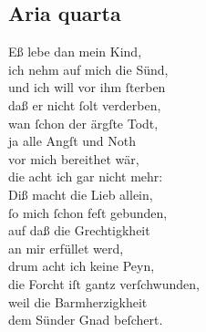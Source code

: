 \documentclass{ees}
\newenvironment{lyrics}[1]{%
  \subsection{#1}\nopagebreak%
  \begin{lyricslist}%
  \let\voice\item%
}{%
  \end{lyricslist}%
}
\newcommand\voiceVater{\voice[Vatter]}
\begin{document}
\begin{lyrics}{Aria quarta}
  \voiceVater
  Eß lebe dan mein Kind,\\
  ich nehm auf mich die Sünd,\\
  und ich will vor ihm ſterben\\
  daß er nicht ſolt verderben,\\
  wan ſchon der ärgſte Todt,\\
  ja alle Angſt und Noth\\
  vor mich bereithet wär,\\
  die acht ich gar nicht mehr:\\[1ex]
  Diß macht die Lieb allein,\\
  ſo mich ſchon feſt gebunden,\\
  auf daß die Grechtigkheit\\
  an mir erfüllet werd,\\
  drum acht ich keine Peyn,\\
  die Forcht iſt gantz verſchwunden,\\
  weil die Barmherzigkheit\\
  dem Sünder Gnad beſchert.
\end{lyrics}
\end{document}
